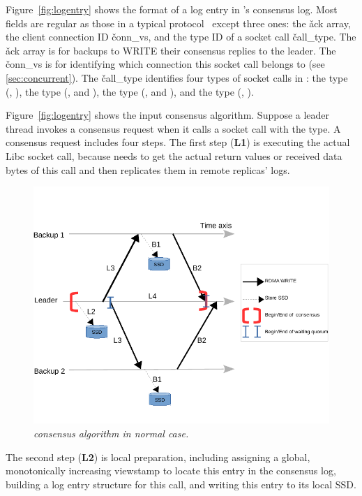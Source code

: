 Figure~\ref{fig:logentry} shows the format of a log entry in \xxx's consensus 
log. Most fields are regular as those in a typical \paxos 
protocol~\cite{paxos:practical} except three ones: the \v{ack} array, the 
client connection ID \v{conn\_vs}, and the type ID of a socket call 
\v{call\_type}. The \v{ack} array is for backups to WRITE their consensus 
replies to the leader. The \v{conn\_vs} is for identifying which connection this 
socket call belongs to (see \ref{sec:concurrent}). The \v{call\_type} 
identifies four types of socket calls in \xxx: the \accept type (\eg, \accept), 
the \recv type (\eg, \recv and \myread), the \send type (\eg, \send and 
\mywrite), and the \close type (\eg, \close).

Figure~\ref{fig:logentry} shows the input consensus algorithm. Suppose a leader 
thread invokes a consensus request when it calls a socket call with the \recv 
type. A consensus request includes four steps. The first step (\textbf{L1}) is 
executing the actual Libc socket call, because \xxx needs to get the actual 
return values or received data bytes of this call and then replicates them in 
remote replicas' logs.

\begin{figure}[b]
\centering
\vspace{-0.15in}
\includegraphics[width=.48\textwidth]{figures/consensus}
\vspace{-.4in}
\caption{{\em \xxx consensus algorithm in normal case.}} \label{fig:consensus}
\vspace{-.05in}
\end{figure}


The second step (\textbf{L2}) is local preparation, including assigning a 
global, monotonically increasing viewstamp to locate this entry in the 
consensus log, building a log entry structure for this call, and writing this 
entry to its local SSD.

